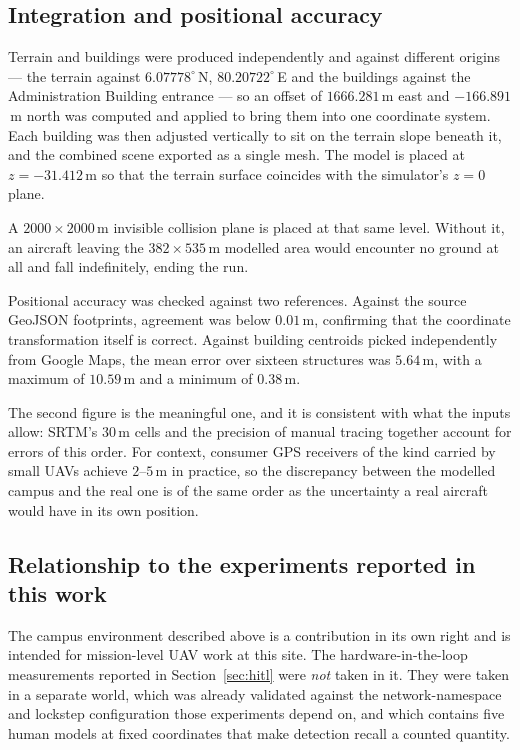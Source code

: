 \subsection{Integration and positional accuracy}
\label{sec:world-integration}

Terrain and buildings were produced independently and against different
origins --- the terrain against $6.07778^{\circ}$\,N,
$80.20722^{\circ}$\,E and the buildings against the Administration Building
entrance --- so an offset of $1666.281$\,m east and $-166.891$\,m north was
computed and applied to bring them into one coordinate system. Each building
was then adjusted vertically to sit on the terrain slope beneath it, and the
combined scene exported as a single mesh. The model is placed at
$z = -31.412$\,m so that the terrain surface coincides with the simulator's
$z = 0$ plane.

A $2000 \times 2000$\,m invisible collision plane is placed at that same
level. Without it, an aircraft leaving the $382 \times 535$\,m modelled area
would encounter no ground at all and fall indefinitely, ending the run.

Positional accuracy was checked against two references. Against the source
GeoJSON footprints, agreement was below $0.01$\,m, confirming that the
coordinate transformation itself is correct. Against building centroids
picked independently from Google Maps, the mean error over sixteen structures
was $5.64$\,m, with a maximum of $10.59$\,m and a minimum of $0.38$\,m.

The second figure is the meaningful one, and it is consistent with what the
inputs allow: SRTM's $30$\,m cells and the precision of manual tracing
together account for errors of this order. For context, consumer GPS
receivers of the kind carried by small UAVs achieve $2$--$5$\,m in practice,
so the discrepancy between the modelled campus and the real one is of the
same order as the uncertainty a real aircraft would have in its own position.

\subsection{Relationship to the experiments reported in this work}
\label{sec:world-scope}

The campus environment described above is a contribution in its own right and
is intended for mission-level UAV work at this site. The hardware-in-the-loop
measurements reported in Section~\ref{sec:hitl} were \emph{not} taken in it.
They were taken in a separate world, which was already validated against the
network-namespace and lockstep configuration those experiments depend on, and
which contains five human models at fixed coordinates that make detection
recall a counted quantity.

